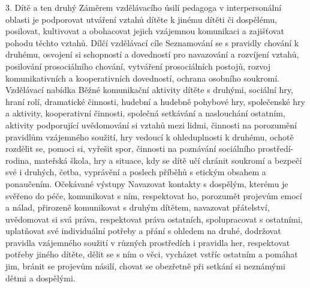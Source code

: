 	3. Dítě a ten druhý
	Záměrem vzdělávacího úsilí pedagoga v interpersonální oblasti je podporovat utváření vztahů dítěte k jinému dítěti či dospělému, posilovat, kultivovat a obohacovat jejich vzájemnou komunikaci a zajišťovat pohodu těchto vztahů.
	Dílčí vzdělávací cíle
	Seznamování se s pravidly chování k druhému, osvojení si schopností a dovedností pro navazování a rozvíjení vztahů, posilování prosociálního chování, vytváření prosociálních postojů, rozvoj komunikativních a kooperativních dovedností, ochrana osobního soukromí.
	Vzdělávací nabídka
	Běžné komunikační aktivity dítěte s druhými, sociální hry, hraní rolí, dramatické činnosti, hudební a hudebně pohybové hry, společenské hry a aktivity, kooperativní činnosti, společná setkávání a naslouchání ostatním, aktivity podporující uvědomování si vztahů mezi lidmi, činnosti na porozumění pravidlům vzájemného soužití, hry vedoucí k ohleduplnosti k druhému, ochotě rozdělit se, pomoci si, vyřešit spor, činnosti na poznávání sociálního prostředí-rodina, mateřská škola, hry a situace, kdy se dítě učí chránit soukromí a bezpečí své i druhých, četba, vyprávění a poslech příběhů s etickým obsahem a ponaučením.
	Očekávané výstupy
	Navazovat kontakty s dospělým, kterému je svěřeno do péče, komunikovat s ním, respektovat ho, porozumět projevům emocí a nálad, přirozeně komunikovat s druhým dítětem, navazovat přátelství, uvědomovat si svá práva, respektovat práva ostatních, spolupracovat s ostatními, uplatňovat své individuální potřeby a přání s ohledem na druhé, dodržovat pravidla vzájemného soužití v různých prostředích i pravidla her, respektovat potřeby jiného dítěte, dělit se s ním o věci, vycházet vstříc ostatním a pomáhat jim, bránit se projevům násilí, chovat se obezřetně při setkání si neznámými dětmi a dospělými.

